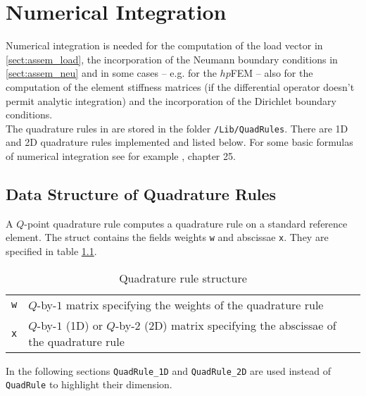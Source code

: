
\chapter{Numerical Integration} \label{chap:quad_rule}  

 Numerical integration is needed for the computation of the load vector in \ref{sect:assem_load}, the incorporation of the Neumann boundary conditions in \ref{sect:assem_neu} and in some cases -- e.g. for the $hp$FEM -- also for the computation of the element stiffness matrices (if the differential operator doesn't permit analytic integration) and the incorporation of the Dirichlet boundary conditions. \\

 The quadrature rules in \LIBNAME are stored in the folder {\tt /Lib/QuadRules}. There are 1D and 2D quadrature rules implemented and listed below. For some basic formulas of numerical integration see for example \cite{AS64}, chapter 25.



\section{Data Structure of Quadrature Rules} 

 A $Q$-point quadrature rule  computes a quadrature rule on a standard reference element. The \MATLAB struct contains the fields weights {\tt w} and abscissae {\tt x}. They are specified in table \ref{tab:quad_rule}.

\begin{table}[htb]
  \begin{tabular}{p{0.5cm}p{10.5cm}}
	{\tt w} & {\small $Q$-by-$1$ matrix specifying the weights of the quadrature rule} \\
    	{\tt x} & {\small $Q$-by-$1$ (1D) or $Q$-by-$2$ (2D) matrix specifying the abscissae of the quadrature rule}
  \end{tabular}
  \caption{Quadrature rule structure }
  \label{tab:quad_rule}
\end{table}

 In the following sections {\tt QuadRule\_1D} and {\tt QuadRule\_2D} are used instead of {\tt QuadRule} to highlight their dimension. \\

